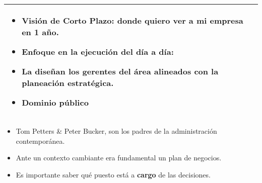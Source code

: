 \begin{itemize}
\begin{center}
\begin{tabular}{| p{5cm} | p{5cm} | }
                    \begin{itemize}
                        \item Visión de Corto Plazo: donde quiero ver a mi empresa en 1 año.
                        \item Enfoque en la ejecución del día a día: 
                        \item La diseñan los gerentes del área alineados con la planeación estratégica.
                        \item Dominio público
                    \end{itemize} 
                    \\ 
                \hline
           \end{tabular}
        \end{center}
        \begin{itemize}[label=\#]
            \item Tom Petters \& Peter Bucker, son los padres de la administración contemporánea.
            \item Ante un contexto cambiante era fundamental un plan de negocios.
            \item Es importante saber qué puesto está a \textbf{cargo} de las decisiones.
        \end{itemize}
        \begin{center}
\end{center}
\end{itemize}
